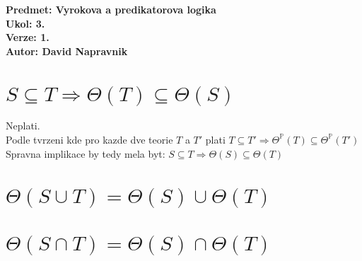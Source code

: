 \documentclass[a4paper]{article}
\begin{document}
\noindent
\textbf{Predmet: Vyrokova a predikatorova logika}\\
\textbf{Ukol: 3.}\\
\textbf{Verze: 1.}\\
\textbf{Autor: David Napravnik}

\section*{$S \subseteq T \Rightarrow \Theta(T) \subseteq \Theta(S)$}
Neplati.\\
Podle tvrzeni kde pro kazde dve teorie $T$ a $T'$ plati $T \subseteq T' \Rightarrow \Theta^{\mathbb{P}}(T) \subseteq \Theta^{\mathbb{P}}(T')$\\
Spravna implikace by tedy mela byt: $S \subseteq T \Rightarrow \Theta(S) \subseteq \Theta(T)$


\section*{$\Theta(S \cup T) = \Theta(S) \cup \Theta(T)$}






\section*{$\Theta(S \cap T) = \Theta(S) \cap \Theta(T)$}
\end{document}
